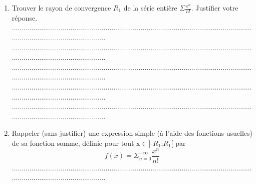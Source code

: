 \documentclass{article}
\begin{document}
\begin{footnotesize}
\begin{enumerate}
    \item Trouver le rayon de convergence $R_{1}$ de la série entière $\Sigma\frac{x^{n}}{n!}$. Justifier votre réponse.\newline\newline
    ...........................................................................................................................................................................\newline
    ...........................................................................................................................................................................\newline
    ...........................................................................................................................................................................\newline
    ...........................................................................................................................................................................\newline
    ...........................................................................................................................................................................\newline\newline
    \item Rappeler (sans justifier) une expression simple (à l'aide des fonctions usuelles) de sa fonction somme, définie pour tout x$\in$]-$R_{1}$;$R_{1}$[ par
    \[ f(x) = \Sigma_{n=0}^{+\infty} \frac{x^{n}}{n!} \]\newline
    ...........................................................................................................................................................................\newline\newline


\end{enumerate}
\end{footnotesize}
\end{document}
